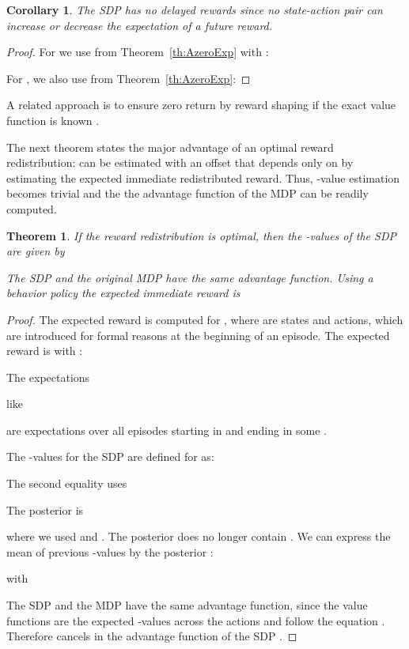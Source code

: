 \documentclass{article}
\newtheorem{theoremA}{Theorem}
\newtheorem{corollaryA}{Corollary}\newtheorem{propositionA}{Proposition}\newtheorem{lemmaA}{Lemma}\newtheorem{conjectureA}{Conjecture}
\begin{document}
\begin{appendices}
\begin{corollaryA}
The SDP has no delayed rewards since no state-action pair
can increase or decrease the expectation of a future reward.
\end{corollaryA}

\begin{proof}
For  we use  from Theorem~\ref{th:AzeroExp}
with :


For ,
we also use  from Theorem~\ref{th:AzeroExp}:


\end{proof}


A related approach is to ensure zero return by 
reward shaping if the exact value function is known \cite{Schulman:15}.


The next theorem states the major advantage of an
optimal reward redistribution:
 can be estimated with an offset that 
depends only on  
by estimating the expected immediate redistributed reward.
Thus, -value estimation becomes trivial and the
the advantage function of the MDP  can be readily computed.
\begin{theoremA}
\label{th:AOptReturnDecomp}
If the reward redistribution is 
optimal, then the -values 
of the SDP  are given by 
 
The SDP  and the original MDP  
have the same advantage function.
Using a behavior policy 
 the expected immediate reward is

\end{theoremA}


\begin{proof}
The expected reward  is computed for , 
where  are states and actions, which are introduced 
for formal reasons at the beginning of an episode. 
The expected reward  
is with :
 

The expectations

like

are expectations over all episodes starting in 
and ending in some .

The -values for the SDP 
are defined for  as:
 
The second equality uses
 

The posterior   is
 
where we used  and  .
The posterior does no longer contain .
We can express the mean of previous -values
by the posterior  :
 
with 
 


The SDP  and the MDP
 have the same advantage function, 
since the value functions are the expected -values across the actions
and follow the equation .
Therefore  cancels in the advantage function of the SDP . 



\end{proof}
\end{appendices}
\end{document}
